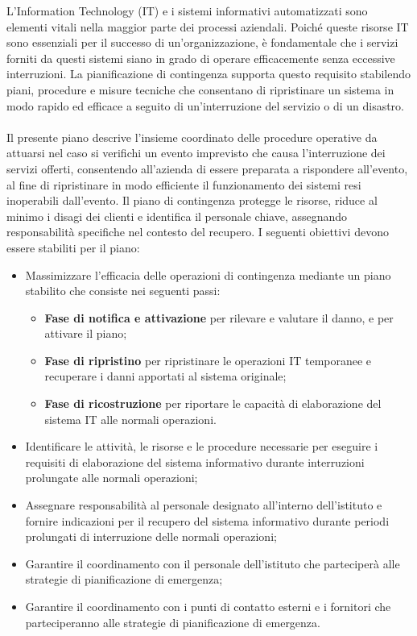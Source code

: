 \documentclass[12pt, a4paper, titlepage]{report}
\begin{document}
		L'Information Technology (IT) e i sistemi informativi automatizzati sono elementi vitali nella maggior parte dei processi aziendali.
		Poiché queste risorse IT sono essenziali per il successo di un'organizzazione, è fondamentale che i servizi forniti da questi sistemi
		siano in grado di operare efficacemente senza eccessive interruzioni.
		La pianificazione di contingenza supporta questo requisito stabilendo piani, procedure e misure tecniche che consentano di ripristinare
		un sistema in modo rapido ed efficace a seguito di un'interruzione del servizio o di un disastro.\\
		\\Il presente piano descrive l'insieme coordinato delle procedure operative da attuarsi
		nel caso si verifichi un evento imprevisto che causa l'interruzione dei servizi offerti,
		consentendo all'azienda di essere preparata a rispondere all'evento, al fine di ripristinare in modo efficiente il funzionamento dei sistemi resi inoperabili dall'evento.
		Il piano di contingenza protegge le risorse, riduce al minimo i disagi dei clienti e identifica il personale chiave, assegnando responsabilità specifiche nel contesto del recupero.
		I seguenti obiettivi devono essere stabiliti per il piano:
		\begin{itemize}
			\item Massimizzare l'efficacia delle operazioni di contingenza mediante un piano stabilito che consiste nei seguenti passi:
				\begin{itemize}
					\item \textbf{Fase di notifica e attivazione} per rilevare e valutare il danno, e per attivare il piano;
					\item \textbf{Fase di ripristino} per ripristinare le operazioni IT temporanee e recuperare i danni apportati al sistema originale;
					\item \textbf{Fase di ricostruzione} per riportare le capacità di elaborazione del sistema IT alle normali operazioni.
				\end{itemize}
			\item Identificare le attività, le risorse e le procedure necessarie per eseguire i requisiti di elaborazione del sistema
			informativo durante interruzioni prolungate alle normali operazioni;
			\item Assegnare responsabilità al personale designato all'interno dell'istituto e fornire indicazioni
			 per il recupero del sistema informativo durante periodi prolungati di interruzione delle normali operazioni;
			\item Garantire il coordinamento con il personale dell'istituto che parteciperà alle strategie di
			pianificazione di emergenza;
			\item Garantire il coordinamento con i punti di contatto esterni e i fornitori che parteciperanno alle strategie di pianificazione
			di emergenza.
		\end{itemize}
		
\end{document}
